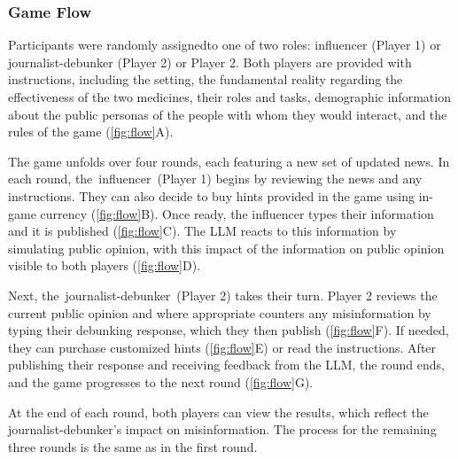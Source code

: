 \subsubsection{Game Flow}
Participants were randomly assignedto one of two roles: influencer (Player 1) or journalist-debunker (Player 2) or Player 2. Both players are provided with instructions, including the setting, the fundamental reality regarding the effectiveness of the two medicines, their roles and tasks, demographic information about the public personas of the people with whom they would interact, and the rules of the game (\autoref{fig:flow}A).

The game unfolds over four rounds, each featuring a new set of updated news. In each round, the influencer (Player 1) begins by reviewing the news and any instructions. They can also decide to buy hints provided in the game using in-game currency (\autoref{fig:flow}B). Once ready, the influencer types their information and it is published (\autoref{fig:flow}C). The LLM reacts to this information by simulating public opinion, with this impact of the information on public opinion visible to both players (\autoref{fig:flow}D).

Next, the journalist-debunker (Player 2) takes their turn. Player 2 reviews the current public opinion and where appropriate counters any misinformation by typing their debunking response, which they then publish (\autoref{fig:flow}F). If needed, they can purchase customized hints (\autoref{fig:flow}E) or read the instructions. After publishing their response and receiving feedback from the LLM, the round ends, and the game progresses to the next round (\autoref{fig:flow}G).

At the end of each round, both players can view the results, which reflect the journalist-debunker’s impact on misinformation. The process for the remaining three rounds is the same as in the first round.


